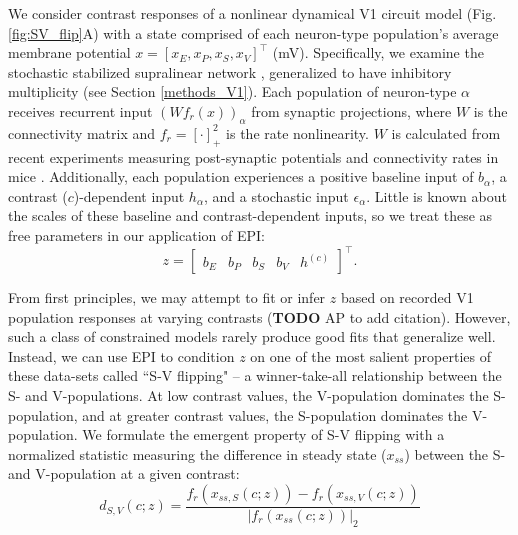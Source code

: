 \documentclass[11pt]{article}
\begin{document}
We consider contrast responses of a nonlinear dynamical V1 circuit model (Fig. \ref{fig:SV_flip}A) with a state comprised of each neuron-type population's average membrane potential $x = \left[x_E, x_P , x_S, x_V \right]^\top$ (mV).
Specifically, we examine the stochastic stabilized supralinear network \cite{hennequin2018dynamical}, generalized to have inhibitory multiplicity (see Section \ref{methods_V1}).
Each population of neuron-type $\alpha$ receives recurrent input $\left(W f_r(x)\right)_\alpha$ from synaptic projections, where $W$ is the connectivity matrix and $f_r = \left[\cdot\right]_+^2$ is the rate nonlinearity.  
$W$ is calculated from recent experiments measuring post-synaptic potentials and connectivity rates in mice  \cite{allen2018layer, billeh2019systematic}.
Additionally, each population experiences a positive baseline input of $b_\alpha$, a contrast ($c$)-dependent input $h_\alpha$, and a stochastic input $\epsilon_\alpha$.
Little is known about the scales of these baseline and contrast-dependent inputs, so we treat these as free parameters in our application of EPI:
 \begin{equation}
 z =  \begin{bmatrix} b_E & b_P & b_S & b_V & h^{(c)} \end{bmatrix}^\top.
\end{equation}

From first principles, we may attempt to fit or infer $z$ based on recorded V1 population responses at varying contrasts (\textbf{TODO} AP to add citation).
However, such a class of constrained models rarely produce good fits that generalize well.
Instead, we can use EPI to condition $z$ on one of the most salient properties of these data-sets called ``S-V flipping" --  a winner-take-all relationship between the S- and V-populations. At low contrast values, the V-population dominates the S-population, and at greater contrast values, the S-population dominates the V-population.  We formulate the emergent property of S-V flipping with a normalized statistic measuring the difference in steady state ($x_{ss}$) between the S- and V-population at a given contrast:
\begin{equation}
d_{S,V}(c; z) = \frac{f_r(x_{ss,S}(c; z)) - f_r(x_{ss,V}(c; z))}{|f_r(x_{ss}(c; z))|_2}
\end{equation}
\end{document}
